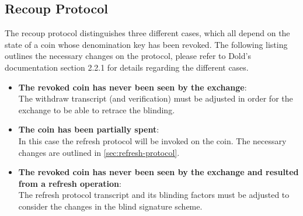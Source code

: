 \subsection{Recoup Protocol}
The recoup protocol distinguishes three different cases, which all depend on the state of a coin whose denomination key has been revoked.
The following listing outlines the necessary changes on the protocol, please refer to Dold's documentation section 2.2.1 \cite{dold:the-gnu-taler-system} for details regarding the different cases.
\begin{itemize}
  \item \textbf{The revoked coin has never been seen by the exchange}:
        \\The withdraw transcript (and verification) must be adjusted in order for the exchange to be able to retrace the blinding.
  \item \textbf{The coin has been partially spent}:
        \\In this case the refresh protocol will be invoked on the coin.
        The necessary changes are outlined in \ref{sec:refresh-protocol}.
  \item \textbf{The revoked coin has never been seen by the exchange and resulted from a refresh operation}:
        \\The refresh protocol transcript and its blinding factors must be adjusted to consider the changes in the blind signature scheme.
\end{itemize}
